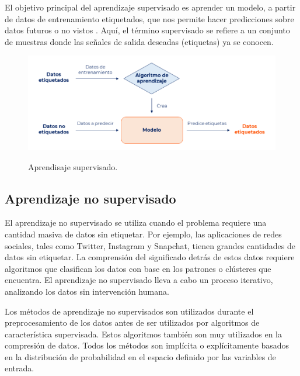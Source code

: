 \vspace{1\baselineskip}
El objetivo principal del aprendizaje supervisado es aprender un modelo, a partir de datos de entrenamiento etiquetados, que nos permite hacer predicciones sobre datos futuros o no vistos \cite{mirjalili2020python}. Aquí, el término supervisado se refiere a un conjunto de muestras donde las señales
de salida deseadas (etiquetas) ya se conocen.

\begin{figure}[H]
  \begin{center}
    \includegraphics[scale=0.60]{./aprendisaje_supervisado.png}
    \caption{Aprendisaje supervisado.}\cite{decide}
    \label{fig:aprendisajesupervisado}
  \end{center}
\end{figure}

\subsection{Aprendizaje no supervisado}

El aprendizaje no supervisado se utiliza cuando el problema requiere una
cantidad masiva de datos sin etiquetar. Por ejemplo, las aplicaciones de redes
sociales, tales como Twitter, Instagram y Snapchat, tienen grandes cantidades
de datos sin etiquetar. La comprensión del significado detrás de estos datos
requiere algoritmos que clasifican los datos con base en los patrones o
clústeres que encuentra. El aprendizaje no supervisado lleva a cabo un proceso
iterativo, analizando los datos sin intervención humana\cite{ibm}.

Los métodos de aprendizaje no supervisados son utilizados durante el
preprocesamiento de los datos antes de ser utilizados por algoritmos de
característica supervisada. Estos algoritmos también son muy utilizados en la
compresión de datos. Todos los métodos son implícita o explícitamente basados
en la distribución de probabilidad en el espacio definido por las variables de
entrada\cite{de2014aprendizaje}.

